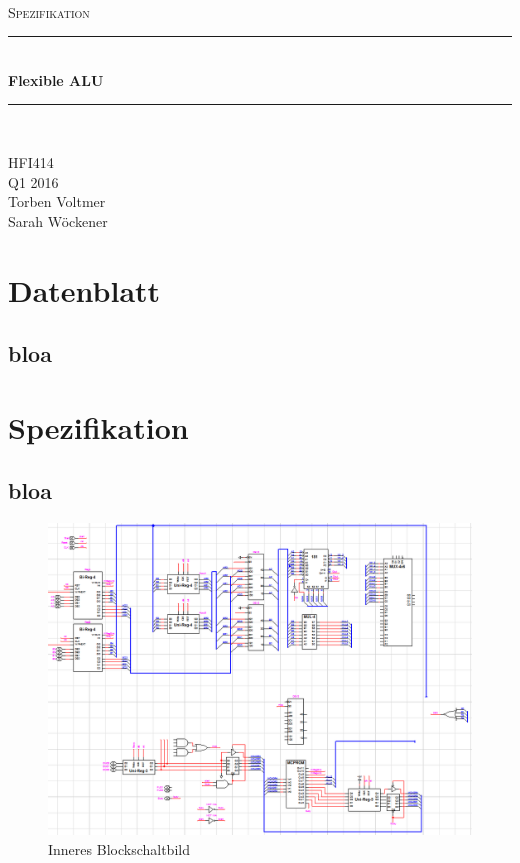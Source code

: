 \documentclass[11pt]{report}
\newcommand{\HRule}[1]{\rule{\linewidth}{#1}} 	%
\begin{document}
	\begin{titlepage}
		\begin{center}
			~\\ [1.0cm]
			
			\textsc{\Large Spezifikation}\\[0.5cm]
			
			\HRule{0.5pt} \\[0.4cm]
			{ \huge \bfseries Flexible ALU \\[0.4cm] }
			\HRule{2pt} \\[2.5cm]
		\end{center}
		

		
		\vfill
		\begin{flushright}
			HFI414\\
			Q1 2016\\
			Torben Voltmer\\
			Sarah Wöckener\\
		\end{flushright}
	\end{titlepage}

	\chapter{Datenblatt}
		
	\section{bloa}

	\chapter{Spezifikation}
		
	\section{bloa}

	\begin{figure}[htbp]
		\begin{center}
			\includegraphics[width=\textwidth]{inneresBlockschaltbild}
			\caption{Inneres Blockschaltbild}
		\end{center}
	\end{figure}
\end{document}

